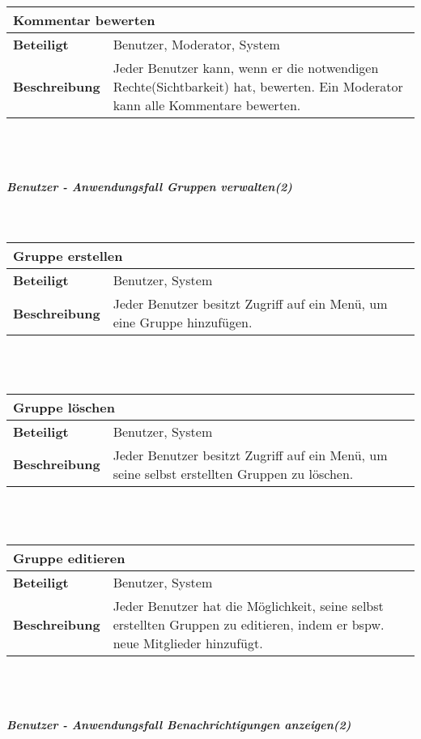 \documentclass[12pt,a4paper]{article}
\begin{document}
\begin{tabular}{l p{10cm}}
\multicolumn{2}{l}{\textbf{Kommentar bewerten}} \\ \hline
\textbf{Beteiligt} & Benutzer, Moderator, System \\ \hline 
\textbf{Beschreibung} & Jeder Benutzer kann, wenn er die notwendigen Rechte(Sichtbarkeit) hat, bewerten. Ein Moderator kann alle Kommentare bewerten.\\ 
\hline 
\end{tabular}\\\\
\subparagraph{Benutzer - Anwendungsfall \glqq Gruppen verwalten\grqq (2)}\mbox{}\\

\begin{tabular}{l p{10cm}}
\multicolumn{2}{l}{\textbf{Gruppe erstellen}} \\ \hline
\textbf{Beteiligt} & Benutzer, System \\ \hline 
\textbf{Beschreibung} & Jeder Benutzer besitzt Zugriff auf ein Menü, um eine Gruppe hinzufügen.\\ 
\hline 
\end{tabular}\\\\

\begin{tabular}{l p{10cm}}
\multicolumn{2}{l}{\textbf{Gruppe löschen}} \\ \hline
\textbf{Beteiligt} & Benutzer, System \\ \hline 
\textbf{Beschreibung} & Jeder Benutzer besitzt Zugriff auf ein Menü, um seine selbst erstellten Gruppen zu löschen.\\ 
\hline 
\end{tabular}\\\\

\begin{tabular}{l p{10cm}}
\multicolumn{2}{l}{\textbf{Gruppe editieren}} \\ \hline
\textbf{Beteiligt} & Benutzer, System \\ \hline 
\textbf{Beschreibung} & Jeder Benutzer hat die Möglichkeit, seine selbst erstellten Gruppen zu editieren, indem er bspw. neue Mitglieder hinzufügt.\\ 
\hline 
\end{tabular}\\\\
\subparagraph{Benutzer - Anwendungsfall \glqq Benachrichtigungen anzeigen\grqq  (2)}\mbox{}\\
\end{document}
